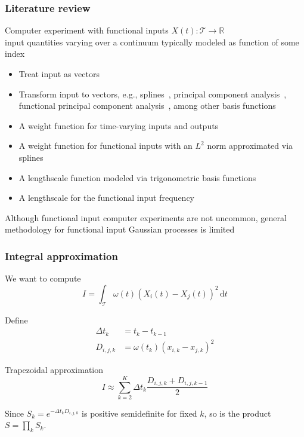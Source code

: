 \documentclass{snedecorbeamer}
\begin{document}
\begin{frame}%
  \label{frm:litrev}
  \frametitle{Literature review}

  Computer experiment with functional inputs $X(t):
  \mathcal{T}\to\mathbb{R}$ \\
  input quantities varying over a continuum typically modeled as function of
  some index

  \begin{itemize}
  \item Treat input as vectors~\cite{iooss2009}
  \item Transform input to vectors, e.g.,
    splines~\cite{betancourt2020,betancourt2020a}, principal component
    analysis~\cite{nanty2016}, functional principal component
    analysis~\cite{wang2017,wang2019}, among other basis
    functions~\cite{tan2019,li2021,striegel2022}
  \item A weight function for time-varying inputs and outputs~\cite{morris2012}
  \item A weight function for functional inputs with an $L^2$ norm approximated
    via splines~\cite{muehlenstaedt2017}
  \item A lengthscale function modeled via trigonometric basis
    functions~\cite{kuttubekova2019}
  \item A lengthscale for the functional input frequency~\cite{Chen2021}
  \end{itemize}

  \vfill{}
  Although functional input computer experiments are not uncommon,
  general methodology for functional input Gaussian processes is limited
\end{frame}

\begin{frame}%
  \label{frm:riemann}
  \frametitle{Integral approximation}

  We want to compute
  \begin{equation}
    I = \int_\mathcal{T}\omega(t){(X_i(t) - X_j(t))}^2\,\mathrm{d}t
  \end{equation}

  Define
  \begin{align}
    \Delta t_k
    &= t_{k} - t_{k - 1} \\
    D_{i,j,k}
    &= \omega(t_{k}) {\left(x_{i, k} - x_{j, k}\right)}^2
  \end{align}

  Trapezoidal approximation
  \begin{equation}
    I\approx
    \sum_{k = 2}^{K}
    \Delta t_k
    \frac{D_{i, j, k} + D_{i, j, k - 1}}{2}
  \end{equation}

  Since
  $S_k = e^{-\Delta t_k D_{i, j, k}}$ is positive semidefinite for fixed $k$, so
  is the product $S = \prod_{k} S_k$.

\end{frame}
\end{document}
